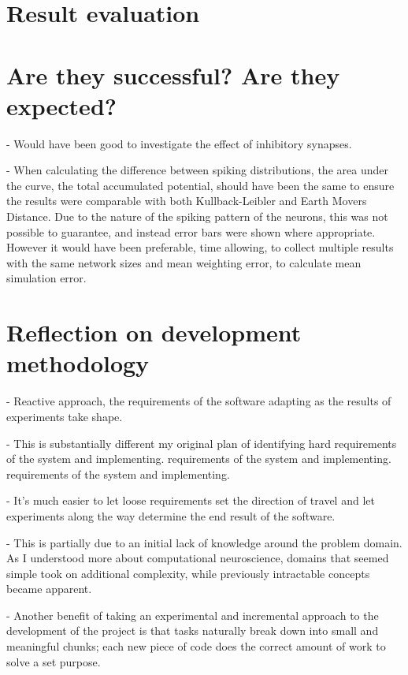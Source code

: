 \section{Result evaluation}

\section{Are they successful? Are they expected?}

- Would have been good to investigate the effect of inhibitory synapses.

- When calculating the difference between spiking distributions, the area under the curve, the total accumulated potential, should have been the same to ensure the results were comparable with both Kullback-Leibler and Earth Movers Distance. Due to the nature of the spiking pattern of the neurons, this was not possible to guarantee, and instead error bars were shown where appropriate. However it would have been preferable, time allowing, to collect multiple results with the same network sizes and mean weighting error, to calculate mean simulation error.

\section{Reflection on development methodology}

- Reactive approach, the requirements of the software adapting as the results
of experiments take shape.

- This is substantially different my original plan of identifying hard
requirements of the system and implementing.
 requirements of the system and implementing. 
requirements of the system and implementing.

- It's much easier to let loose requirements set the direction of travel and
let experiments along the way determine the end result of the software.

- This is partially due to an initial lack of knowledge around the problem
domain. As I understood more about computational neuroscience, domains that
seemed simple took on additional complexity, while previously intractable
concepts became apparent.

- Another benefit of taking an experimental and incremental approach to the
development of the project is that tasks naturally break down into small and
meaningful chunks; each new piece of code does the correct amount of work to
solve a set purpose.

